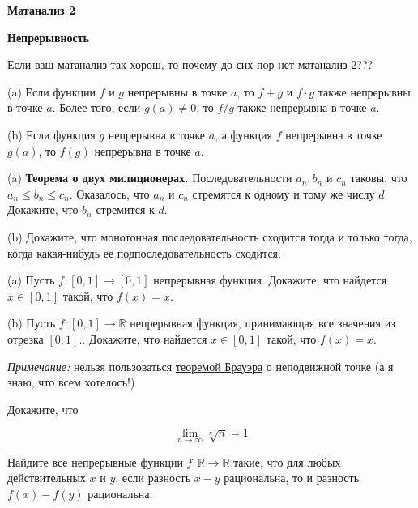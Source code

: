\centerline{\bf \Huge Матанализ 2}
\centerline{\bf \Huge Непрерывность}

\begin{flushright}
        \scriptsize{Если ваш матанализ так хорош, то почему до сих пор нет матанализ 2???}
\end{flushright}

(a) Если функции $f$ и $g$ непрерывны в точке $a$, то $f+g$ и $f \cdot g$ также непрерывны в точке $a$. Более того, если $g(a) \neq 0$, то $f / g$ также непрерывна в точке $a$.

(b) Если функция $g$ непрерывна в точке $a$, а функция $f$ непрерывна в точке $g(a)$, то $f(g)$ непрерывна в точке $a$.

(a) \textbf{Теорема о двух милиционерах.} Последовательности $a_n, b_n$ и $c_n$ таковы, что $a_n \leqslant b_n \leqslant c_n$. Оказалось, что $a_n$ и $c_n$ стремятся к одному и тому же числу $d$. Докажите, что $b_n$ стремится к $d$.

(b) Докажите, что монотонная последовательность сходится тогда и только тогда, когда какая-нибудь ее подпоследовательность сходится.

(a) Пусть $f:[0,1] \rightarrow[0,1]$ непрерывная функция. Докажите, что найдется $x \in[0,1]$ такой, что $f(x)=x$.

(b) Пусть $f:[0,1] \rightarrow \mathbb{R}$ непрерывная функция, принимающая все значения из отрезка $[0,1]$.. Докажите, что найдется $x \in[0,1]$ такой, что $f(x)=x$. 

\textit{Примечание:} нельзя пользоваться \href{https://ru.wikipedia.org/wiki/Теорема_Брауэра_о_неподвижной_точке}{теоремой Брауэра} о неподвижной точке (а я знаю, что всем хотелось!)

Докажите, что

$$
\lim _{n \rightarrow \infty} \sqrt[n]{n}=1
$$

Найдите все непрерывные функции $f: \mathbb{R} \rightarrow \mathbb{R}$ такие, что для любых действительных $x$ и $y$, если разность $x-y$ рациональна, то и разность $f(x)-f(y)$ рациональна.